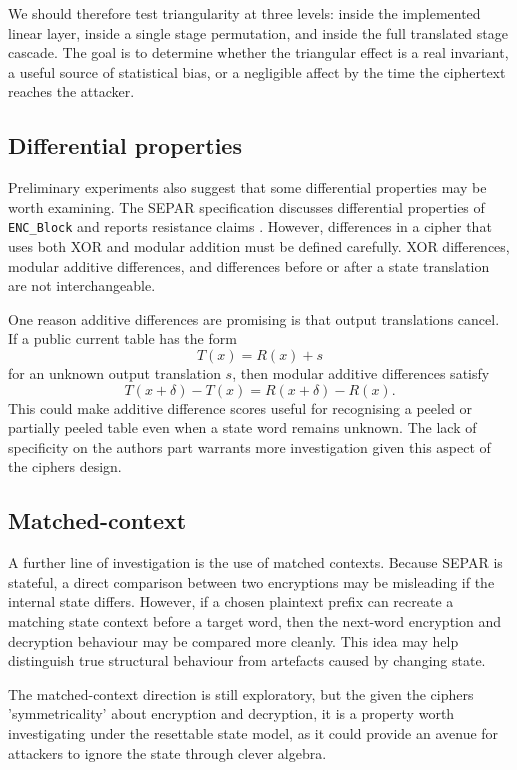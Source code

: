 \documentclass[11pt]{article}
\begin{document}
We should therefore test triangularity at three levels: inside the implemented linear layer, inside a single stage permutation, and inside the full translated stage cascade. The goal is to determine whether the triangular effect is a real invariant, a useful source of statistical bias, or a negligible affect by the time the ciphertext reaches the attacker.

\subsection{Differential properties}

Preliminary experiments also suggest that some differential properties may be worth examining. The SEPAR specification discusses differential properties of \texttt{ENC\_Block} and reports resistance claims \cite{VahiJassbi2020,VahiMirnia2021}. However, differences in a cipher that uses both XOR and modular addition must be defined carefully. XOR differences, modular additive differences, and differences before or after a state translation are not interchangeable.

One reason additive differences are promising is that output translations cancel. If a public current table has the form
\[
T(x)=R(x)+s
\]
for an unknown output translation $s$, then modular additive differences satisfy
\[
T(x+\delta)-T(x)=R(x+\delta)-R(x).
\]
This could make additive difference scores useful for recognising a peeled or partially peeled table even when a state word remains unknown. The lack of specificity on the authors part warrants more investigation given this aspect of the ciphers design.

\subsection{Matched-context}

A further line of investigation is the use of matched contexts. Because SEPAR is stateful, a direct comparison between two encryptions may be misleading if the internal state differs. However, if a chosen plaintext prefix can recreate a matching state context before a target word, then the next-word encryption and decryption behaviour may be compared more cleanly. This idea may help distinguish true structural behaviour from artefacts caused by changing state.

The matched-context direction is still exploratory, but the given the ciphers 'symmetricality' about encryption and decryption, it is a property worth investigating under the resettable state model, as it could provide an avenue for attackers to ignore the state through clever algebra.
\end{document}
